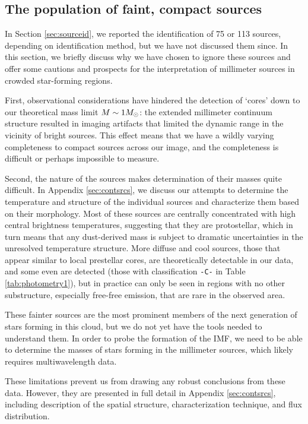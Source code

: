 \documentclass{emulateapj}
\begin{document}
\subsection{The population of faint, compact sources}
\label{sec:faintsrcs_discussion}
In Section \ref{sec:sourceid}, we reported the identification of 75 or 113
sources, depending on identification method, but we have not discussed them since.
In this section, we briefly discuss why we have chosen to ignore these sources
and offer some cautions and prospects for the interpretation of millimeter sources
in crowded star-forming regions. 

First, observational considerations have hindered the detection of `cores' down
to our theoretical mass limit $M\sim1M_{\odot}$: the  extended millimeter continuum
structure resulted in imaging artifacts that limited the dynamic range in the
vicinity of bright sources.  This effect means that we have a wildly varying
completeness to compact sources across our image, and the completeness is
difficult or perhaps impossible to measure.

Second, the nature of the sources makes determination of their masses quite
difficult.  In Appendix \ref{sec:contsrcs}, we discuss our attempts to
determine the temperature and structure of the individual sources and
characterize them based on their morphology.  Most of these sources are
centrally concentrated with high central brightness temperatures, suggesting
that they are protostellar, which in turn means that any dust-derived mass is
subject to dramatic uncertainties in the unresolved temperature structure.
More diffuse and cool sources, those that appear similar to local prestellar
cores, are theoretically detectable in our data, and some even are detected
(those with classification \texttt{-C-} in Table \ref{tab:photometry1}), but in
practice can only be seen in regions with no other substructure, especially
free-free emission, that are rare in the observed area.

These fainter sources are the most prominent members of the next generation of
stars forming in this cloud, but we do not yet have the tools needed to
understand them.  In order to probe the formation of the IMF, we need to be
able to determine the masses of stars forming in the millimeter sources, which
likely requires multiwavelength data.  

These limitations prevent us from drawing any robust conclusions from these
data.  However, they are presented in full detail in Appendix
\ref{sec:contsrcs}, including description of the spatial structure,
characterization technique, and flux distribution.
\end{document}
